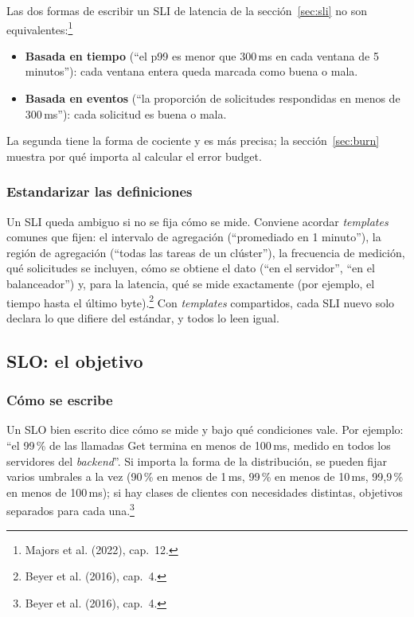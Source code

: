 \documentclass[variant=apuntes,cover=institutional,mode=screen]{ua-engineering-v6-article}
\begin{document}
Las dos formas de escribir un SLI de latencia de la sección~\ref{sec:sli} no son equivalentes:\footnote{Majors et al. (2022), cap.~12.}
\begin{itemize}
\item \textbf{Basada en tiempo} (``el p99 es menor que 300\,ms en cada ventana de 5 minutos''): cada ventana entera queda marcada como buena o mala.
\item \textbf{Basada en eventos} (``la proporción de solicitudes respondidas en menos de 300\,ms''): cada solicitud es buena o mala.
\end{itemize}
La segunda tiene la forma de cociente y es más precisa; la sección~\ref{sec:burn} muestra por qué importa al calcular el error budget.

\subsubsection{Estandarizar las definiciones}

Un SLI queda ambiguo si no se fija cómo se mide. Conviene acordar \emph{templates} comunes que fijen: el intervalo de agregación (``promediado en 1 minuto''), la región de agregación (``todas las tareas de un clúster''), la frecuencia de medición, qué solicitudes se incluyen, cómo se obtiene el dato (``en el servidor'', ``en el balanceador'') y, para la latencia, qué se mide exactamente (por ejemplo, el tiempo hasta el último byte).\footnote{Beyer et al. (2016), cap.~4.} Con \emph{templates} compartidos, cada SLI nuevo solo declara lo que difiere del estándar, y todos lo leen igual.

\subsection{SLO: el objetivo}\label{sec:slo}

\subsubsection{Cómo se escribe}

Un SLO bien escrito dice cómo se mide y bajo qué condiciones vale. Por ejemplo: ``el 99\,\% de las llamadas Get termina en menos de 100\,ms, medido en todos los servidores del \emph{backend}''. Si importa la forma de la distribución, se pueden fijar varios umbrales a la vez (90\,\% en menos de 1\,ms, 99\,\% en menos de 10\,ms, 99,9\,\% en menos de 100\,ms); si hay clases de clientes con necesidades distintas, objetivos separados para cada una.\footnote{Beyer et al. (2016), cap.~4.}
\end{document}
